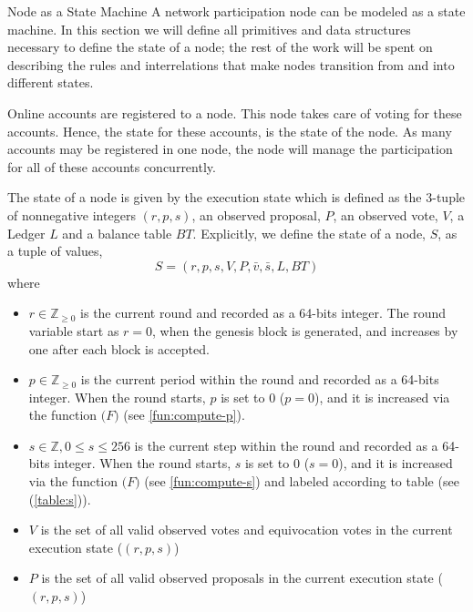 \documentclass[10pt,a4paper]{article}
\begin{document}
\begin{section}{Node as a State Machine}
A network participation node can be modeled as a state machine.
In this section we will define all primitives and data structures necessary to define the state
of a node; the rest of the work will be spent on describing the rules and interrelations that
make nodes transition from and into different states.

Online accounts are registered to a node. This node takes care of voting for these accounts.
Hence, the state for these accounts, is the state of the node. As many accounts may be 
registered in one node, the node will manage the participation for all of these accounts 
concurrently.

The {\sf state of a node} 
is given by the {\sf execution state} which is defined as the 3-tuple of nonnegative integers $(r, p, s)$, 
an observed proposal, $P$, 
an observed vote, $V$, 
a Ledger $L$ and 
a balance table $BT$.
Explicitly, we define the state of a node, $S$, as a tuple of values, 
$$
S = (r, p, s, V, P, \bar{v}, \bar{s}, L, BT)
$$ 
where
\begin{itemize}
    \item 
    $r\in\mathbb{Z}_{\ge 0}$ is the current round and recorded as a 64-bits integer. 
    The round variable start as $r=0$, when the genesis block is generated, and increases
    by one after each block is accepted.
    
    \item 
    $p\in\mathbb{Z}_{\ge 0}$ is the current period within the round and recorded as 
    a 64-bits integer. When the round starts, $p$ is set to 0 ($p=0$), and it is 
    increased via the function $\mathcal(F)$ (see \ref{fun:compute-p}).
    
    \item 
    $s\in\mathbb{Z}, 0\le s\le 256$ is the current {\sf step} within the round
    and recorded as a 64-bits integer. When the round starts, $s$ is set to 0 ($s=0$), 
    and it is increased via the function $\mathcal(F)$ (see \ref{fun:compute-s}) and 
    labeled according to table (see (\ref{table:s})).
    
    \item
    $V$ is the set of all {\sf valid observed votes} and 
    {\sf equivocation votes} in the current execution state
    ($(r,p,s)$)
    
    \item
    $P$ is the set of all {\sf valid observed proposals}
    in the current execution state ($(r,p,s)$)
    

\end{itemize}
\end{section}
\end{document}
